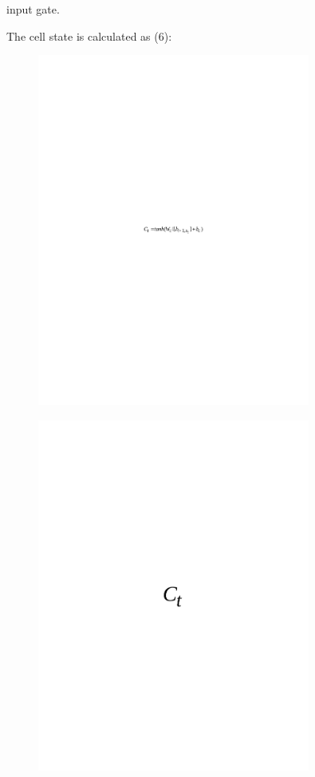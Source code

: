 input gate.

The cell state is calculated as (6):

\begin{figure}[H]
	\centering
	\includegraphics[width=0.8\textwidth]{media/ict/image56}
	\caption*{}
\end{figure}


\begin{figure}[H]
	\centering
	\includegraphics[width=0.8\textwidth]{media/ict/image57}
	\caption*{}
\end{figure}

